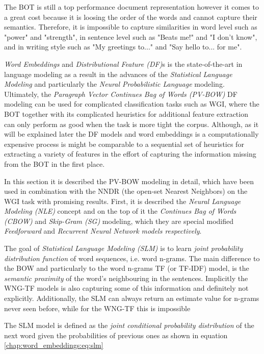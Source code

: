 The BOT is still a top performance document representation however it comes to a great cost because it is loosing the order of the words and cannot capture their semantics. Therefore, it is impossible to capture similarities in word level such as "power" and "strength", in sentence level such as "Beats me!" and "I don't know", and in writing style such as "My greetings to..." and "Say hello to... for me". 

\textit{Word Embeddings} and \textit{Distributional Feature (DF)}s is the state-of-the-art in language modeling as a result in the advances of the \textit{Statistical Language Modeling} and particularly the \textit{Neural Probabilistic Language} modeling. Ultimately, the \textit{Paragraph Vector Continues Bag of Words (PV-BOW)} DF modeling can be used for complicated classification tasks such as WGI, where the BOT together with its complicated heuristics for additional feature extraction can only perform as good when the task is more tight the corpus. Although, as it will be explained later the DF models and word embeddings is a computationally expensive process is might be comparable to a sequential set of heuristics for extracting a variety of features in the effort of capturing the information missing from the BOT in the first place.  

In this section it is described the PV-BOW modeling in detail, which have been used in combination with the NNDR (the open-set Nearest Neighbors) on the WGI task with promising results. First, it is described the \textit{Neural Language Modeling (NLE)} concept and on the top of it the \textit{Continues Bag of Words  (CBOW)} and  \textit{Skip-Gram (SG)} modeling, which they are special modified \textit{Feedforward} and \textit{Recurrent Neural Network models respectively}.

The goal of \textit{Statistical Language Modeling (SLM) } is to learn \textit{joint probability distribution function} of word sequences, i.e. word n-grams. The main difference to the BOW and particularly to the word n-grams TF (or TF-IDF) model, is the \textit{semantic proximity} of the word's neighbouring in the sentences. Implicitly the WNG-TF models is also capturing some of this information and definitely not explicitly. Additionally, the SLM can always return an estimate value for n-grams never seen before, while for the WNG-TF this is impossible  \parencite{bengio2003neural}

The SLM model is defined as the \textit{joint conditional probability distribution} of the next word given the probabilities of previous ones as shown in equation \ref{chap:word_embeddings:eq:slm}

